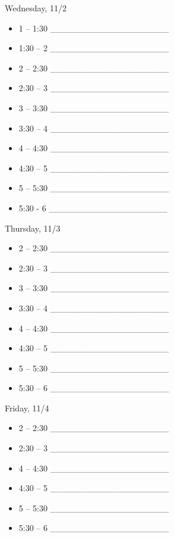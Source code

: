 \documentclass[]{article}
\date{}
\begin{document}
Wednesday, 11/2

\begin{itemize}
\item
  1 -- 1:30 \_\_\_\_\_\_\_\_\_\_\_\_\_\_\_\_\_\_\_
\item
  1:30 -- 2 \_\_\_\_\_\_\_\_\_\_\_\_\_\_\_\_\_\_\_
\item
  2 -- 2:30 \_\_\_\_\_\_\_\_\_\_\_\_\_\_\_\_\_\_\_
\item
  2:30 -- 3 \_\_\_\_\_\_\_\_\_\_\_\_\_\_\_\_\_\_\_
\item
  3 -- 3:30 \_\_\_\_\_\_\_\_\_\_\_\_\_\_\_\_\_\_\_
\item
  3:30 -- 4 \_\_\_\_\_\_\_\_\_\_\_\_\_\_\_\_\_\_\_
\item
  4 -- 4:30 \_\_\_\_\_\_\_\_\_\_\_\_\_\_\_\_\_\_\_
\item
  4:30 -- 5 \_\_\_\_\_\_\_\_\_\_\_\_\_\_\_\_\_\_\_
\item
  5 -- 5:30 \_\_\_\_\_\_\_\_\_\_\_\_\_\_\_\_\_\_\_
\item
  5:30 - 6 \_\_\_\_\_\_\_\_\_\_\_\_\_\_\_\_\_\_\_
\end{itemize}

Thursday, 11/3

\begin{itemize}
\item
  2 -- 2:30 \_\_\_\_\_\_\_\_\_\_\_\_\_\_\_\_\_\_\_
\item
  2:30 -- 3 \_\_\_\_\_\_\_\_\_\_\_\_\_\_\_\_\_\_\_
\item
  3 -- 3:30 \_\_\_\_\_\_\_\_\_\_\_\_\_\_\_\_\_\_\_
\item
  3:30 -- 4 \_\_\_\_\_\_\_\_\_\_\_\_\_\_\_\_\_\_\_
\item
  4 -- 4:30 \_\_\_\_\_\_\_\_\_\_\_\_\_\_\_\_\_\_\_
\item
  4:30 -- 5 \_\_\_\_\_\_\_\_\_\_\_\_\_\_\_\_\_\_\_
\item
  5 -- 5:30 \_\_\_\_\_\_\_\_\_\_\_\_\_\_\_\_\_\_\_
\item
  5:30 -- 6 \_\_\_\_\_\_\_\_\_\_\_\_\_\_\_\_\_\_\_
\end{itemize}

Friday, 11/4

\begin{itemize}
\item
  2 -- 2:30 \_\_\_\_\_\_\_\_\_\_\_\_\_\_\_\_\_\_\_
\item
  2:30 -- 3 \_\_\_\_\_\_\_\_\_\_\_\_\_\_\_\_\_\_\_
\item
  4 -- 4:30 \_\_\_\_\_\_\_\_\_\_\_\_\_\_\_\_\_\_\_
\item
  4:30 -- 5 \_\_\_\_\_\_\_\_\_\_\_\_\_\_\_\_\_\_\_
\item
  5 -- 5:30 \_\_\_\_\_\_\_\_\_\_\_\_\_\_\_\_\_\_\_
\item
  5:30 -- 6 \_\_\_\_\_\_\_\_\_\_\_\_\_\_\_\_\_\_\_
\end{itemize}
\end{document}
